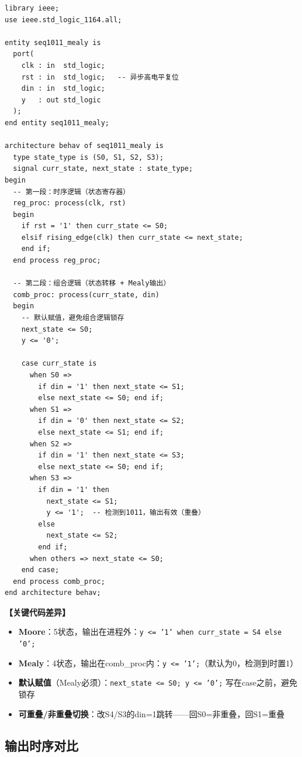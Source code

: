 \begin{lstlisting}[caption={Mealy型1011序列检测器}]
library ieee;
use ieee.std_logic_1164.all;

entity seq1011_mealy is
  port(
    clk : in  std_logic;
    rst : in  std_logic;   -- 异步高电平复位
    din : in  std_logic;
    y   : out std_logic
  );
end entity seq1011_mealy;

architecture behav of seq1011_mealy is
  type state_type is (S0, S1, S2, S3);
  signal curr_state, next_state : state_type;
begin
  -- 第一段：时序逻辑（状态寄存器）
  reg_proc: process(clk, rst)
  begin
    if rst = '1' then curr_state <= S0;
    elsif rising_edge(clk) then curr_state <= next_state;
    end if;
  end process reg_proc;

  -- 第二段：组合逻辑（状态转移 + Mealy输出）
  comb_proc: process(curr_state, din)
  begin
    -- 默认赋值，避免组合逻辑锁存
    next_state <= S0;
    y <= '0';

    case curr_state is
      when S0 =>
        if din = '1' then next_state <= S1;
        else next_state <= S0; end if;
      when S1 =>
        if din = '0' then next_state <= S2;
        else next_state <= S1; end if;
      when S2 =>
        if din = '1' then next_state <= S3;
        else next_state <= S0; end if;
      when S3 =>
        if din = '1' then
          next_state <= S1;
          y <= '1';  -- 检测到1011，输出有效（重叠）
        else
          next_state <= S2;
        end if;
      when others => next_state <= S0;
    end case;
  end process comb_proc;
end architecture behav;
\end{lstlisting}

\textbf{【关键代码差异】}
\begin{itemize}
  \item \textbf{Moore}：5状态，输出在进程外：\texttt{y <= '1' when curr\_state = S4 else '0';}
  \item \textbf{Mealy}：4状态，输出在comb\_proc内：\texttt{y <= '1';}（默认为0，检测到时置1）
  \item \textbf{默认赋值}（Mealy必须）：\texttt{next\_state <= S0; y <= '0';} 写在case之前，避免锁存
  \item \textbf{可重叠/非重叠切换}：改S4/S3的din=1跳转——回S0=非重叠，回S1=重叠
\end{itemize}

\subsection{输出时序对比}

